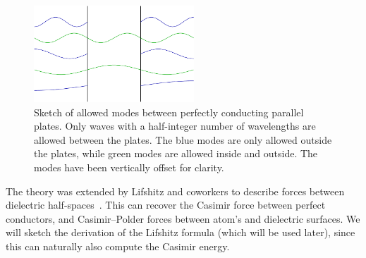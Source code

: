 \begin{figure}
\center
\includegraphics[width=6cm]{fig/intro/twoplanes_wave}
\caption[Allowed modes between parallel plates]
{Sketch of allowed modes between perfectly conducting parallel plates. 
 Only waves with a half-integer number of wavelengths are allowed between the plates.
The blue modes are only allowed outside the plates, while green modes are allowed inside
and outside.  The modes have been vertically offset for clarity.  }
\label{fig:Casimir_sketch}
\end{figure}

The theory was extended by Lifshitz and coworkers to describe forces between dielectric half-spaces~\citep{Lifshitz1956,
Dzyaloshinskii1959,Dzyaloshinskii1961}.  This can recover the Casimir force between 
perfect conductors, and Casimir--Polder forces between atom's and dielectric surfaces.  
We will sketch the derivation of the Lifshitz formula (which will be used later),
since this can naturally also compute the Casimir energy.



